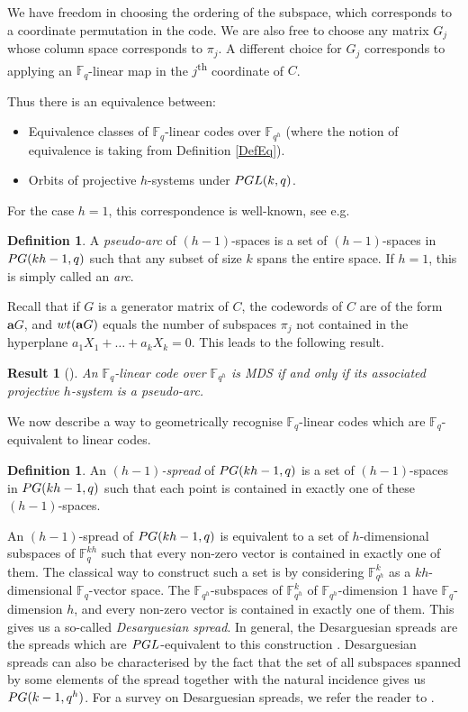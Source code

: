 \documentclass[a4paper]{article}
\newtheorem{res}[thm]{Result}
\theoremstyle{definition}
\newtheorem{df}[thm]{Definition}
\newcommand{\FF}{\mathbb F}
\newcommand{\pg}{\textnormal{PG}}
\newcommand{\wt}{\textnormal{wt}}
\newcommand{\pgl}{\textnormal{PGL}}
\begin{document}
We have freedom in choosing the ordering of the subspace, which corresponds to a coordinate permutation in the code.
We are also free to choose any matrix $G_j$ whose column space corresponds to $\pi_j$.
A different choice for $G_j$ corresponds to applying an $\FF_q$-linear map in the $j$\textsuperscript{th} coordinate of $C$.

Thus there is an equivalence between:
 \begin{itemize}
  \item Equivalence classes of $\FF_q$-linear codes over $\FF_{q^h}$ (where the notion of equivalence is taking from Definition \ref{DefEq}).
  \item Orbits of projective $h$-systems under $\pgl(k,q)$.
 \end{itemize}
For the case $h=1$, this correspondence is well-known, see e.g.\ \cite[\S 1.1.2]{tsfasmanvladut}

\begin{df}
 A \emph{pseudo-arc} of $(h-1)$-spaces is a set of $(h-1)$-spaces in $\pg(kh-1,q)$ such that any subset of size $k$ spans the entire space.
 If $h=1$, this is simply called an \emph{arc}.
\end{df}

Recall that if $G$ is a generator matrix of $C$, the codewords of $C$ are of the form $\mathbf a G$, and $\wt(\mathbf a G)$ equals the number of subspaces $\pi_j$ not contained in the hyperplane $a_1 X_1 + \dots + a_k X_k = 0$.
This leads to the following result.

\begin{res}[{\cite{gamboa}}]
 An $\FF_q$-linear code over $\FF_{q^h}$ is MDS if and only if its associated projective $h$-system is a pseudo-arc.
\end{res}

We now describe a way to geometrically recognise $\FF_q$-linear codes which are $\FF_q$-equivalent to linear codes.

\begin{df}
 An \emph{$(h-1)$-spread} of $\pg(kh-1,q)$ is a set of $(h-1)$-spaces in $\pg(kh-1,q)$ such that each point is contained in exactly one of these $(h-1)$-spaces.
\end{df}

An $(h-1)$-spread of $\pg(kh-1,q)$ is equivalent to a set of $h$-dimensional subspaces of $\FF_q^{kh}$ such that every non-zero vector is contained in exactly one of them.
The classical way to construct such a set is by considering $\FF_{q^h}^k$ as a $kh$-dimensional $\FF_q$-vector space.
The $\FF_{q^h}$-subspaces of $\FF_{q^h}^k$ of $\FF_{q^h}$-dimension 1 have $\FF_q$-dimension $h$, and every non-zero vector is contained in exactly one of them.
This gives us a so-called \emph{Desarguesian spread}.
In general, the Desarguesian spreads are the spreads which are $\pgl$-equivalent to this construction \cite[Corollary 3.8]{vandevoorde16}.
Desarguesian spreads can also be characterised by the fact that the set of all subspaces spanned by some elements of the spread together with the natural incidence gives us $\pg(k-1,q^h)$.
For a survey on Desarguesian spreads, we refer the reader to \cite{baderlunardon}.
\end{document}
